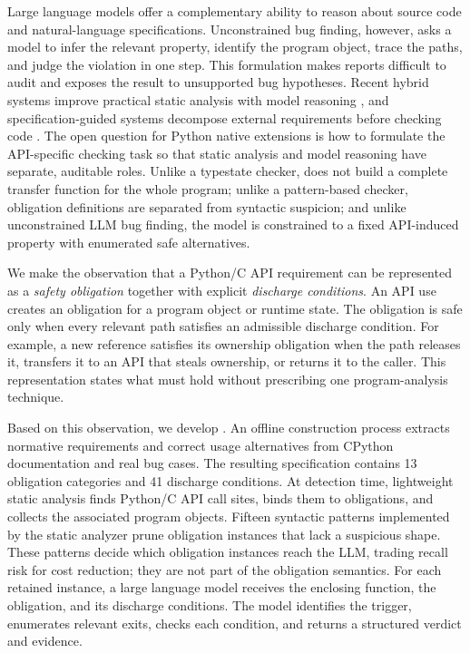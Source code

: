 Large language models offer a complementary ability to reason about source
code and natural-language specifications. Unconstrained bug finding, however,
asks a model to infer the relevant property, identify the program object, trace
the paths, and judge the violation in one step. This formulation makes reports
difficult to audit and exposes the result to unsupported bug hypotheses.
Recent hybrid systems improve practical static analysis with model reasoning
\cite{li2024llmstatic}, and specification-guided systems decompose external
requirements before checking code \cite{safe4u2025,rfcaudit2025}. The open
question for Python native extensions is how to formulate the API-specific
checking task so that static analysis and model reasoning have separate,
auditable roles. Unlike a typestate checker, \tool does not build a complete
transfer function for the whole program; unlike a pattern-based checker,
obligation definitions are separated from syntactic suspicion; and unlike
unconstrained LLM bug finding, the model is constrained to a fixed
API-induced property with enumerated safe alternatives.

We make the observation that a Python/C API requirement can be represented as
a \emph{safety obligation} together with explicit \emph{discharge
conditions}. An API use creates an obligation for a program object or runtime
state. The obligation is safe only when every relevant path satisfies an
admissible discharge condition. For example, a new reference satisfies its
ownership obligation when the path releases it, transfers it to an API that
steals ownership, or returns it to the caller. This representation states what
must hold without prescribing one program-analysis technique.

Based on this observation, we develop \tool. An offline construction process
extracts normative requirements and correct usage alternatives from CPython
documentation and real bug cases. The resulting specification contains 13
obligation categories and 41 discharge conditions. At detection time,
lightweight static analysis finds Python/C API call sites, binds them to
obligations, and collects the associated program objects. Fifteen syntactic
patterns implemented by the static analyzer prune obligation instances that
lack a suspicious shape. These patterns decide which obligation instances reach
the LLM, trading recall risk for cost reduction; they are not part of the
obligation semantics. For each retained instance, a large language
model receives the enclosing function, the obligation, and its discharge conditions.
The model identifies the trigger, enumerates relevant exits, checks each
condition, and returns a structured verdict and evidence.

